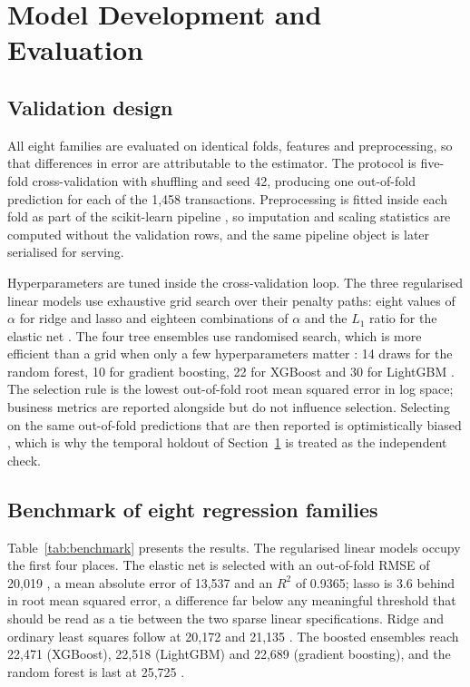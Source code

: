 \section{Model Development and Evaluation}
\label{sec:models}

\subsection{Validation design}

All eight families are evaluated on identical folds, features and preprocessing, so
that differences in error are attributable to the estimator. The protocol is
five-fold cross-validation with shuffling and seed 42, producing one out-of-fold
prediction for each of the 1,458 transactions. Preprocessing is fitted inside each
fold as part of the scikit-learn pipeline \citep{pedregosa2011sklearn}, so imputation
and scaling statistics are computed without the validation rows, and the same
pipeline object is later serialised for serving.

Hyperparameters are tuned inside the cross-validation loop. The three regularised
linear models use exhaustive grid search over their penalty paths: eight values of
$\alpha$ for ridge and lasso and eighteen combinations of $\alpha$ and the $L_1$
ratio for the elastic net \citep{tibshirani1996lasso,zou2005elasticnet}. The four
tree ensembles use randomised search, which is more efficient than a grid when only a
few hyperparameters matter \citep{bergstra2012random}: 14 draws for the random
forest, 10 for gradient boosting, 22 for XGBoost and 30 for LightGBM
\citep{chen2016xgboost,ke2017lightgbm}. The selection rule is the lowest out-of-fold
root mean squared error in log space; business metrics are reported alongside but do
not influence selection. Selecting on the same out-of-fold predictions that are then
reported is optimistically biased \citep{varma2006bias}, which is why the temporal
holdout of Section~\ref{sec:models} is treated as the independent check.

\subsection{Benchmark of eight regression families}

Table~\ref{tab:benchmark} presents the results. The regularised linear models occupy
the first four places. The elastic net is selected with an out-of-fold RMSE of 20,019
\USD, a mean absolute error of 13,537 \USD{} and an $R^2$ of 0.9365; lasso is 3.6
\USD{} behind in root mean squared error, a difference far below any meaningful
threshold that should be read as a tie between the two sparse linear specifications.
Ridge and ordinary least squares follow at 20,172 and 21,135 \USD. The boosted
ensembles reach 22,471 \USD{} (XGBoost), 22,518 \USD{} (LightGBM) and 22,689 \USD{}
(gradient boosting), and the random forest is last at 25,725 \USD.

